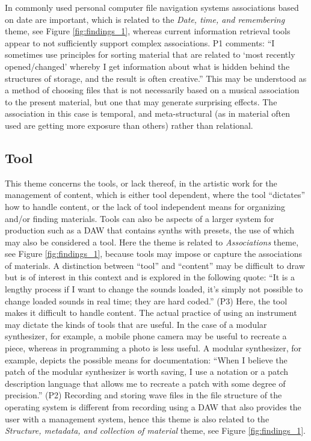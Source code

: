 \documentclass[runningheads,a4paper]{cmmr2023}
\begin{document}
In commonly used personal computer file navigation systems associations based on date are important, which is related to the \emph{Date, time, and remembering} theme, see Figure \ref{fig:findings_1}, whereas current information retrieval tools appear to not sufficiently support complex associations. P1 comments: “I sometimes use principles for sorting material that are related to ‘most recently opened/changed’ whereby I get information about what is hidden behind the structures of storage, and the result is often creative.” This may be understood as a method of choosing files that is not necessarily based on a musical association to the present material, but one that may generate surprising effects. The association in this case is temporal, and meta-structural (as in material often used are getting more exposure than others) rather than relational.

\subsection{Tool}
\label{sec:tool}
This theme concerns the tools, or lack thereof, in the artistic work for the management of content, which is either tool dependent, where the tool “dictates” how to handle content, or the lack of tool independent means for organizing and/or finding materials. Tools can also be aspects of a larger system for production such as a DAW that contains synths with presets, the use of which may also be considered a tool. Here the theme is related to \emph{Associations} theme, see Figure \ref{fig:findings_1},  because tools may impose or capture the associations of materials. A distinction between “tool” and “content” may be difficult to draw but is of interest in this context and is explored in the following quote: “It is a lengthy process if I want to change the sounds loaded, it's simply not possible to change loaded sounds in real time; they are hard coded.” (P3) Here, the tool makes it difficult to handle content. The actual practice of using an instrument may dictate the kinds of tools that are useful. In the case of a modular synthesizer, for example, a mobile phone camera may be useful to recreate a piece, whereas in programming a photo is less useful. A modular synthesizer, for example, depicts the possible means for documentation: “When I believe the patch of the modular synthesizer is worth saving, I use a notation or a patch description language that allows me to recreate a patch with some degree of precision.” (P2)
Recording and storing wave files in the file structure of the operating system is different from recording using a DAW that also provides the user with a management system, hence this theme is also related to the \emph{Structure, metadata, and collection of material} theme, see Figure \ref{fig:findings_1}.
\end{document}
